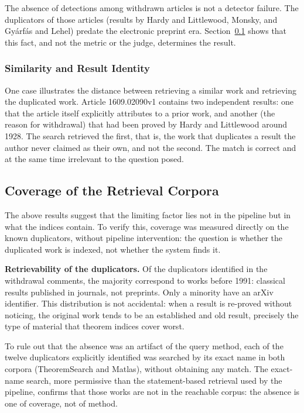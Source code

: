 The absence of detections among withdrawn articles is not a detector failure. The duplicators of those articles (results by Hardy and Littlewood, Monsky, and Gyárfás and Lehel) predate the electronic preprint era. Section~\ref{ssec:cobertura} shows that this fact, and not the metric or the judge, determines the result.

\subsubsection{Similarity and Result Identity}

One case illustrates the distance between retrieving a similar work and retrieving the duplicated work. Article 1609.02090v1 contains two independent results: one that the article itself explicitly attributes to a prior work, and another (the reason for withdrawal) that had been proved by Hardy and Littlewood around 1928. The search retrieved the first, that is, the work that duplicates a result the author never claimed as their own, and not the second. The match is correct and at the same time irrelevant to the question posed.

\subsection{Coverage of the Retrieval Corpora}
\label{ssec:cobertura}

The above results suggest that the limiting factor lies not in the pipeline but in what the indices contain. To verify this, coverage was measured directly on the known duplicators, without pipeline intervention: the question is whether the duplicated work is indexed, not whether the system finds it.

\textbf{Retrievability of the duplicators.} Of the duplicators identified in the withdrawal comments, the majority correspond to works before 1991: classical results published in journals, not preprints. Only a minority have an arXiv identifier. This distribution is not accidental: when a result is re-proved without noticing, the original work tends to be an established and old result, precisely the type of material that theorem indices cover worst.

To rule out that the absence was an artifact of the query method, each of the twelve duplicators explicitly identified was searched by its exact name in both corpora (TheoremSearch and Matlas), without obtaining any match. The exact-name search, more permissive than the statement-based retrieval used by the pipeline, confirms that those works are not in the reachable corpus: the absence is one of coverage, not of method.

